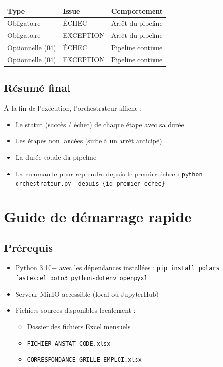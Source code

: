 \documentclass[12pt,a4paper,french]{report}
\begin{document}
\begin{tabularx}{\textwidth}{llX}
  \toprule
  \textbf{Type} & \textbf{Issue} & \textbf{Comportement} \\
  \midrule
  Obligatoire & ÉCHEC & Arrêt du pipeline \\
  Obligatoire & EXCEPTION & Arrêt du pipeline \\
  Optionnelle (04) & ÉCHEC & Pipeline continue \\
  Optionnelle (04) & EXCEPTION & Pipeline continue \\
  \bottomrule
\end{tabularx}

\section{Résumé final}

À la fin de l'exécution, l'orchestrateur affiche :
\begin{itemize}[nosep]
  \item Le statut (succès / échec) de chaque étape avec sa durée
  \item Les étapes non lancées (suite à un arrêt anticipé)
  \item La durée totale du pipeline
  \item La commande pour reprendre depuis le premier échec :
        \texttt{python orchestrateur.py --depuis \{id\_premier\_echec\}}
\end{itemize}

\chapter{Guide de démarrage rapide}

\section{Prérequis}

\begin{itemize}
  \item Python 3.10+ avec les dépendances installées :
        \texttt{pip install polars fastexcel boto3 python-dotenv openpyxl}
  \item Serveur MinIO accessible (local ou JupyterHub)
  \item Fichiers sources disponibles localement :
    \begin{itemize}[nosep]
      \item Dossier des fichiers Excel mensuels
      \item \texttt{FICHIER\_ANSTAT\_CODE.xlsx}
      \item \texttt{CORRESPONDANCE\_GRILLE\_EMPLOI.xlsx}
    \end{itemize}
\end{itemize}
\end{document}
